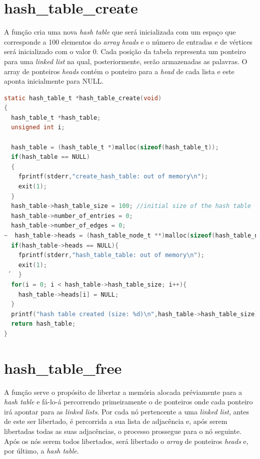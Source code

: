 	\section{hash\_table\_create}
	\label{hashtablecreate}
	A função cria uma nova \textit{hash table} que será inicializada com um espaço que corresponde a 100 elementos do \textit{array heads} e o número de entradas e de vértices será inicializado com o valor 0. Cada posição da tabela representa um ponteiro para uma \textit{linked list} na qual, posteriormente, serão armazenadas as palavras. O array de ponteiros \textit{heads} contém o ponteiro para a \textit{head} de cada lista e este aponta inicialmente para NULL.
	
	\begin{lstlisting}[language=C]
static hash_table_t *hash_table_create(void)
{
  hash_table_t *hash_table;
  unsigned int i;

  hash_table = (hash_table_t *)malloc(sizeof(hash_table_t));
  if(hash_table == NULL)
  {
    fprintf(stderr,"create_hash_table: out of memory\n");
    exit(1);
  }
  hash_table->hash_table_size = 100; //initial size of the hash table
  hash_table->number_of_entries = 0;
  hash_table->number_of_edges = 0;
~  hash_table->heads = (hash_table_node_t **)malloc(sizeof(hash_table_node_t) * hash_table->hash_table_size);
  if(hash_table->heads == NULL){
    fprintf(stderr,"hash_table_table: out of memory\n");
    exit(1);
 ´  }
  for(i = 0; i < hash_table->hash_table_size; i++){
    hash_table->heads[i] = NULL;
  }
  printf("hash table created (size: %d)\n",hash_table->hash_table_size);
  return hash_table;
}
	\end{lstlisting}
	
	\section{hash\_table\_free}
	\label{hashtablefree}
	A função serve o propósito de libertar a memória alocada préviamente para a \textit{hash table} e fá-lo-á percorrendo primeiramente o  de ponteiros  onde cada ponteiro irá apontar para as \textit{linked lists}. Por cada nó pertencente a uma \textit{linked list}, antes de este ser libertado, é percorrida a sua lista de adjacência e, após serem libertadas todas as suas adjacências, o processo prossegue para o nó seguinte. Após os nós serem todos libertados, será libertado o \textit{array} de ponteiros \textit{heads} e, por último, a \textit{hash table}.

